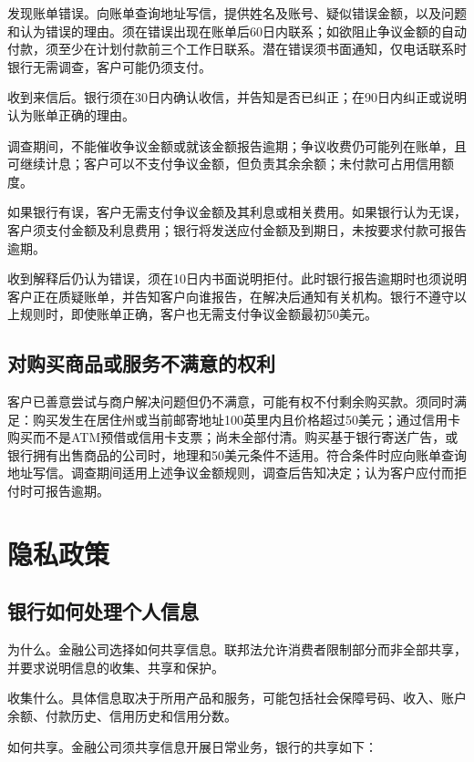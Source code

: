 \documentclass[UTF8,fontset=none,11pt,a4paper]{ctexart}
\begin{document}
发现账单错误。向账单查询地址写信，提供姓名及账号、疑似错误金额，以及问题和认为错误的理由。须在错误出现在账单后60日内联系；如欲阻止争议金额的自动付款，须至少在计划付款前三个工作日联系。潜在错误须书面通知，仅电话联系时银行无需调查，客户可能仍须支付。


收到来信后。银行须在30日内确认收信，并告知是否已纠正；在90日内纠正或说明认为账单正确的理由。


调查期间，不能催收争议金额或就该金额报告逾期；争议收费仍可能列在账单，且可继续计息；客户可以不支付争议金额，但负责其余余额；未付款可占用信用额度。


如果银行有误，客户无需支付争议金额及其利息或相关费用。如果银行认为无误，客户须支付金额及利息费用；银行将发送应付金额及到期日，未按要求付款可报告逾期。


收到解释后仍认为错误，须在10日内书面说明拒付。此时银行报告逾期时也须说明客户正在质疑账单，并告知客户向谁报告，在解决后通知有关机构。银行不遵守以上规则时，即使账单正确，客户也无需支付争议金额最初50美元。


\subsection*{对购买商品或服务不满意的权利}
客户已善意尝试与商户解决问题但仍不满意，可能有权不付剩余购买款。须同时满足：购买发生在居住州或当前邮寄地址100英里内且价格超过50美元；通过信用卡购买而不是ATM预借或信用卡支票；尚未全部付清。购买基于银行寄送广告，或银行拥有出售商品的公司时，地理和50美元条件不适用。符合条件时应向账单查询地址写信。调查期间适用上述争议金额规则，调查后告知决定；认为客户应付而拒付时可报告逾期。


\section*{隐私政策}
\subsection*{银行如何处理个人信息}
为什么。金融公司选择如何共享信息。联邦法允许消费者限制部分而非全部共享，并要求说明信息的收集、共享和保护。


收集什么。具体信息取决于所用产品和服务，可能包括社会保障号码、收入、账户余额、付款历史、信用历史和信用分数。


如何共享。金融公司须共享信息开展日常业务，银行的共享如下：
\end{document}
